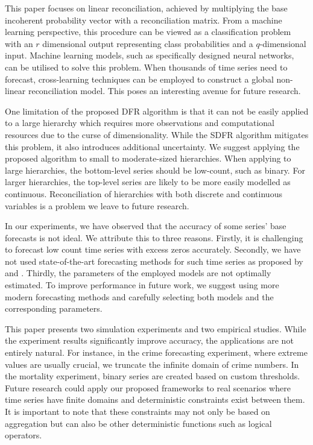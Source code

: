 \documentclass[a4paper,review,12pt,authoryear]{elsarticle}
\theoremstyle{definition}
\begin{document}
     This paper focuses on linear reconciliation, achieved by multiplying the base incoherent probability vector with a reconciliation matrix.
     From a machine learning perspective, this procedure can be viewed as a classification problem with an $r$ dimensional output representing class probabilities and a $q$-dimensional input. Machine learning models, such as specifically designed neural networks, can be utilised to solve this problem.
     When thousands of time series need to forecast, cross-learning techniques can be employed to construct a global non-linear reconciliation model. This poses an interesting avenue for future research.

     One limitation of the proposed DFR algorithm is that it can not be easily applied to a large hierarchy which requires more observations and computational resources due to the curse of dimensionality.
     While the SDFR algorithm mitigates this problem, it also introduces additional uncertainty.
     We suggest applying the proposed algorithm to small to moderate-sized hierarchies. When applying to large hierarchies, the bottom-level series should be low-count, such as binary. For larger hierarchies, the top-level series are likely to be more easily modelled as continuous. Reconciliation of hierarchies with both discrete and continuous variables is a problem we leave to future research.

     In our experiments, we have observed that the accuracy of some series' base forecasts is not ideal.
     We attribute this to three reasons. Firstly, it is challenging to forecast low count time series with excess zeros accurately.
     Secondly, we have not used state-of-the-art forecasting methods for such time series as proposed by \cite{berryBayesianForecastingMany2020a} and \cite{weissEfficientAccountingEstimation2022}.
     Thirdly, the parameters of the employed models are not optimally estimated.
     To improve performance in future work, we suggest using more modern forecasting methods and carefully selecting both models and the corresponding parameters.

     This paper presents two simulation experiments and two empirical studies.
     While the experiment results significantly improve accuracy, the applications are not entirely natural.
     For instance, in the crime forecasting experiment, where extreme values are usually crucial, we truncate the infinite domain of crime numbers.
     In the mortality experiment, binary series are created based on custom thresholds.
     Future research could apply our proposed frameworks to real scenarios where time series have finite domains and deterministic constraints exist between them.
     It is important to note that these constraints may not only be based on aggregation but can also be other deterministic functions such as logical operators.
\end{document}
